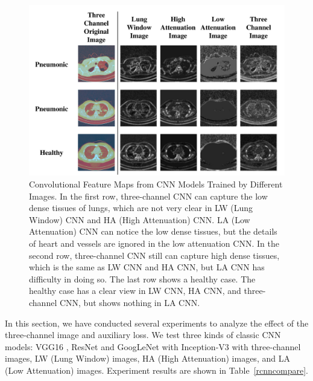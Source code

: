 \documentclass[journal]{IEEEtran}
\begin{document}
\begin{figure}[t]
    \centerline{\includegraphics[width=150mm]{show.pdf}}
    \vspace{-0cm}
    \caption{Convolutional Feature Maps from CNN Models Trained by Different Images. In the first row, three-channel CNN can capture the low dense tissues of lungs, which are not very clear in LW (Lung Window) CNN and HA (High Attenuation) CNN. LA (Low Attenuation) CNN can notice the low dense tissues, but the details of heart and vessels are ignored in the low attenuation CNN. 
    In the second row, three-channel CNN still can capture high dense tissues, which is the same as LW CNN and HA CNN, but LA CNN has difficulty in doing so. The last row shows a healthy case. The healthy case has a clear view in LW CNN, HA CNN, and three-channel CNN, but shows nothing in LA CNN.}
    \vspace{-0cm}
    \label{show}
    \end{figure}

In this section, we have conducted several experiments to analyze the effect of the three-channel image and auxiliary loss. 
We test three kinds of classic CNN models: VGG16 \cite{simonyan2015very}, ResNet \cite{he2016deep} and GoogLeNet with Inception-V3 \cite{szegedy2016rethinking} with three-channel images, LW (Lung Window) images, HA (High Attenuation) images, and LA (Low Attenuation) images. Experiment results are shown in Table~\ref{rcnncompare}. 
\end{document}
